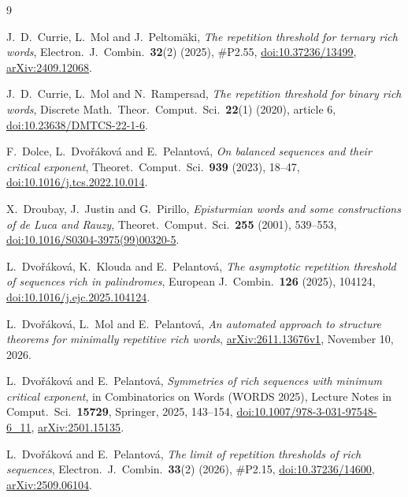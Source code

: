 \documentclass[11pt]{article}
\theoremstyle{remark}
\begin{document}
\begin{thebibliography}{9}

J.~D.~Currie, L.~Mol and J.~Peltomäki,
\emph{The repetition threshold for ternary rich words},
Electron.\ J.\ Combin.\ \textbf{32}(2) (2025), \#P2.55,
\href{https://doi.org/10.37236/13499}{doi:10.37236/13499},
\href{https://arxiv.org/abs/2409.12068}{arXiv:2409.12068}.

J.~D.~Currie, L.~Mol and N.~Rampersad,
\emph{The repetition threshold for binary rich words},
Discrete Math.\ Theor.\ Comput.\ Sci.\ \textbf{22}(1) (2020), article 6,
\href{https://doi.org/10.23638/DMTCS-22-1-6}{doi:10.23638/DMTCS-22-1-6}.

F.~Dolce, L.~Dvořáková and E.~Pelantová,
\emph{On balanced sequences and their critical exponent},
Theoret.\ Comput.\ Sci.\ \textbf{939} (2023), 18--47,
\href{https://doi.org/10.1016/j.tcs.2022.10.014}{doi:10.1016/j.tcs.2022.10.014}.

X.~Droubay, J.~Justin and G.~Pirillo,
\emph{Episturmian words and some constructions of de Luca and Rauzy},
Theoret.\ Comput.\ Sci.\ \textbf{255} (2001), 539--553,
\href{https://doi.org/10.1016/S0304-3975(99)00320-5}{doi:10.1016/S0304-3975(99)00320-5}.

L.~Dvořáková, K.~Klouda and E.~Pelantová,
\emph{The asymptotic repetition threshold of sequences rich in palindromes},
European J.\ Combin.\ \textbf{126} (2025), 104124,
\href{https://doi.org/10.1016/j.ejc.2025.104124}{doi:10.1016/j.ejc.2025.104124}.

L.~Dvořáková, L.~Mol and E.~Pelantová,
\emph{An automated approach to structure theorems for minimally repetitive rich words},
\href{https://arxiv.org/abs/2611.13676}{arXiv:2611.13676v1}, November 10, 2026.

L.~Dvořáková and E.~Pelantová,
\emph{Symmetries of rich sequences with minimum critical exponent},
in Combinatorics on Words (WORDS 2025), Lecture Notes in Comput.\ Sci.\ \textbf{15729},
Springer, 2025, 143--154,
\href{https://doi.org/10.1007/978-3-031-97548-6_11}{doi:10.1007/978-3-031-97548-6\_11},
\href{https://arxiv.org/abs/2501.15135}{arXiv:2501.15135}.

L.~Dvořáková and E.~Pelantová,
\emph{The limit of repetition thresholds of rich sequences},
Electron.\ J.\ Combin.\ \textbf{33}(2) (2026), \#P2.15,
\href{https://doi.org/10.37236/14600}{doi:10.37236/14600},
\href{https://arxiv.org/abs/2509.06104}{arXiv:2509.06104}.

\end{thebibliography}
\end{document}
